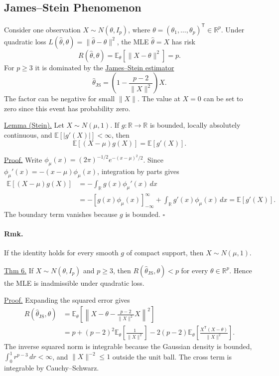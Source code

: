 \documentclass[11pt,a4paper]{article}
\begin{document}
\subsection*{James--Stein Phenomenon}

Consider one observation $X\sim N(\theta,I_p)$, where
$\theta=(\theta_1,\ldots,\theta_p)^{\mathsf T}\in\mathbb R^p$.
Under quadratic loss $L(\hat\theta,\theta)=\|\hat\theta-\theta\|^2$,
the MLE $\hat\theta=X$ has risk
\[
R(\hat\theta,\theta)=\mathbb E_\theta[\|X-\theta\|^2]=p.
\]
For $p\geq 3$ it is dominated by the \underline{James--Stein estimator}
\[
\hat\theta_{\mathrm{JS}}
=\left(1-\frac{p-2}{\|X\|^2}\right)X.
\]
The factor can be negative for small $\|X\|$. The value at $X=0$ can
be set to zero since this event has probability zero.

\medskip
\noindent\underline{Lemma (Stein).}\quad
Let $X\sim N(\mu,1)$. If $g\colon\mathbb R\to\mathbb R$ is bounded,
locally absolutely continuous, and $\mathbb E[|g'(X)|]<\infty$, then
\[
\mathbb E[(X-\mu)g(X)]=\mathbb E[g'(X)].
\]

\noindent\underline{Proof.}\quad
Write $\phi_\mu(x)=(2\pi)^{-1/2}e^{-(x-\mu)^2/2}$. Since
$\phi_\mu'(x)=-(x-\mu)\phi_\mu(x)$, integration by parts gives
\[
\begin{aligned}
\mathbb E[(X-\mu)g(X)]
&=-\int_{\mathbb R}g(x)\phi_\mu'(x)\,dx\\
&=-[g(x)\phi_\mu(x)]_{-\infty}^{\infty}
  +\int_{\mathbb R}g'(x)\phi_\mu(x)\,dx
=\mathbb E[g'(X)].
\end{aligned}
\]
The boundary term vanishes because $g$ is bounded. \hfill$\square$

\paragraph{Rmk.}
If the identity holds for every smooth $g$ of compact support, then
$X\sim N(\mu,1)$.

\medskip
\noindent\underline{Thm 6.}\quad
If $X\sim N(\theta,I_p)$ and $p\geq 3$, then
$R(\hat\theta_{\mathrm{JS}},\theta)<p$ for every $\theta\in\mathbb R^p$.
Hence the MLE is inadmissible under quadratic loss.

\medskip
\noindent\underline{Proof.}\quad
Expanding the squared error gives
\[
\begin{aligned}
R(\hat\theta_{\mathrm{JS}},\theta)
&=\mathbb E_\theta\left[
  \left\|X-\theta-\frac{p-2}{\|X\|^2}X\right\|^2\right]\\
&=p+(p-2)^2\mathbb E_\theta\left[\frac{1}{\|X\|^2}\right]
 -2(p-2)\mathbb E_\theta\left[\frac{X^{\mathsf T}(X-\theta)}{\|X\|^2}\right].
\end{aligned}
\]
The inverse squared norm is integrable because the Gaussian density is
bounded, $\int_0^1 r^{p-3}\,dr<\infty$, and $\|X\|^{-2}\leq 1$
outside the unit ball. The cross term is integrable by Cauchy--Schwarz.
\end{document}
